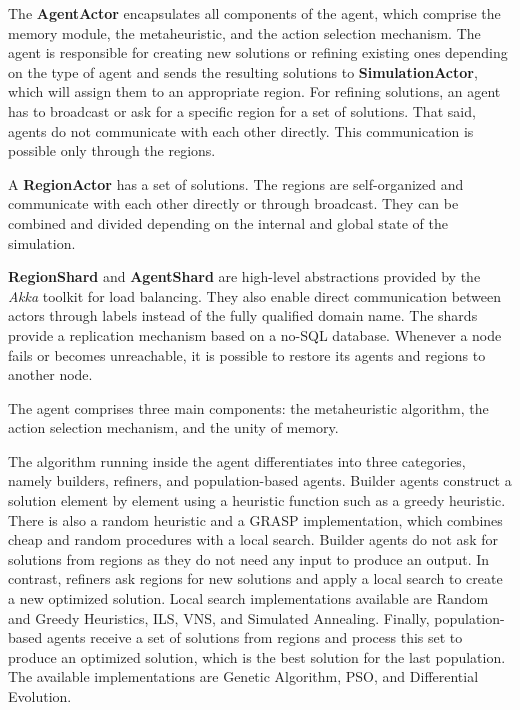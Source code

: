 \documentclass[preprint,12pt]{elsarticle}
\begin{document}
The \textbf{AgentActor} encapsulates all components of the agent, which comprise the memory module, the metaheuristic, and the action selection mechanism. The agent is responsible for creating new solutions or refining existing ones depending on the type of agent and sends the resulting solutions to \textbf{SimulationActor}, which will assign them to an appropriate region. For refining solutions, an agent has to broadcast or ask for a specific region for a set of solutions. That said, agents do not communicate with each other directly. This communication is possible only through the regions. 

A \textbf{RegionActor} has a set of solutions. The regions are self-organized and communicate with each other directly or through broadcast. They can be combined and divided depending on the internal and global state of the simulation. 

 \textbf{RegionShard} and \textbf{AgentShard} are high-level abstractions provided by the \textit{Akka} toolkit for load balancing. They also enable direct communication between actors through labels instead of the fully qualified domain name. The shards provide a replication mechanism based on a no-SQL database. Whenever a node fails or becomes unreachable, it is possible to restore its agents and regions to another node. 

The agent comprises three main components: the metaheuristic algorithm, the action selection mechanism, and the unity of memory. 


The algorithm running inside the agent differentiates into three categories, namely builders, refiners, and population-based agents. Builder agents construct a solution element by element using a heuristic function such as a greedy heuristic. There is also a random heuristic and a GRASP\cite{resende2016grasp} implementation, which combines cheap and random procedures with a local search. Builder agents do not ask for solutions from regions as they do not need any input to produce an output. In contrast, refiners ask regions for new solutions and apply a local search to create a new optimized solution. Local search implementations available are Random and Greedy Heuristics, ILS\cite{lourencco2003ils}, VNS\cite{mladenovic1997vns}, and Simulated Annealing\cite{van1987sa}. Finally, population-based agents receive a set of solutions from regions and process this set to produce an optimized solution, which is the best solution for the last population. The available implementations are Genetic Algorithm, PSO\cite{marini2015pso}, and Differential Evolution\cite{price2013de}. 
\end{document}
